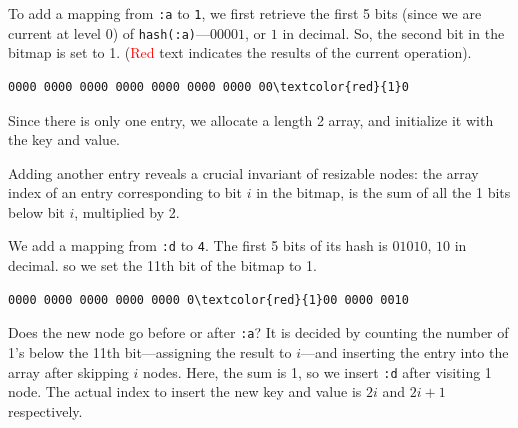 \documentclass[preprint]{sigplanconf}
\begin{document}
To add a mapping from
\texttt{:a} to \texttt{1}, we first retrieve
the first 5 bits (since we are current at level 0)
of \texttt{hash(:a)}---$00001$, or $1$
in decimal. So, the second bit in the bitmap
is set to 1. (\textcolor{red}{Red} text indicates the results of the
current operation).

\begin{Verbatim}[commandchars=\\\{\},codes={\catcode`$=3\catcode`^=7\catcode`_=8}]
0000 0000 0000 0000 0000 0000 0000 00\textcolor{red}{1}0
\end{Verbatim}


Since there is only one entry, we allocate a length 2 array,
and initialize it with the key and value.

Adding another entry reveals a crucial invariant
of resizable nodes: the array index of an entry
corresponding to bit $i$ in the bitmap,
is the sum of all the 1 bits below bit $i$,
multiplied by 2.

We add a mapping from \texttt{:d} to \texttt{4}.
The first 5 bits of its hash is $01010$, $10$ in decimal.
so we set the 11th bit of the bitmap to 1.

\begin{Verbatim}[commandchars=\\\{\},codes={\catcode`$=3\catcode`^=7\catcode`_=8}]
0000 0000 0000 0000 0000 0\textcolor{red}{1}00 0000 0010
\end{Verbatim}


Does the new node go before or after \texttt{:a}?
It is decided by counting the number of 1's
below the 11th bit---assigning the result to $i$---and inserting the entry
into the array after skipping $i$ nodes.
Here, the sum is 1, so we insert \texttt{:d}
after visiting 1 node.
The actual index to insert the new key and value is
$2i$
and
$2i+1$
respectively.
\end{document}
